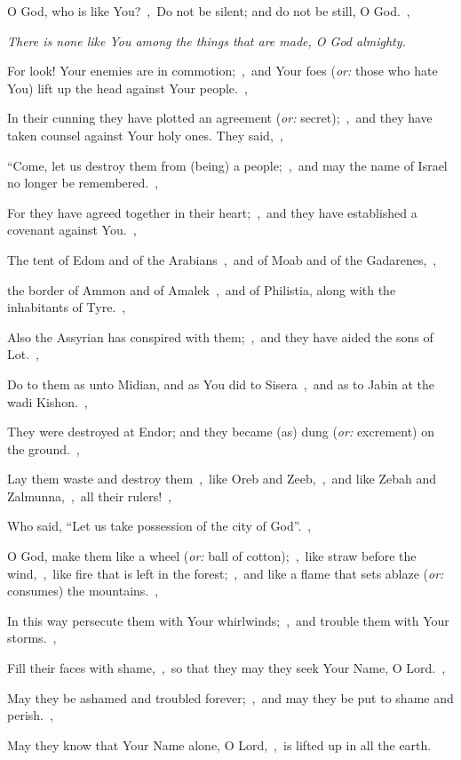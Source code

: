 \documentclass[12pt,twoside,a5paper]{article}
\newcommand{\qanona}[1]{{\liturgicalhint{Qanona.} \emph{#1}}}
\newcommand{\translationoption}[1]{\emph{or:} #1}
\begin{document}
\begin{normalparskip}
  O God, who is like You?~\sep\ Do not be silent; and do not be still, O God.~\sep

  \qanona{There is none like You among the things that are made, O God almighty.}

  For look! Your enemies are in commotion;~\sep\ and Your foes (\translationoption{those who hate You}) lift up the head against Your people.~\sep

  In their cunning they have plotted an agreement (\translationoption{secret});~\sep\ and they have taken counsel against Your holy ones. They said,~\sep

  ``Come, let us destroy them from (being) a people;~\sep\ and may the name of Israel no longer be remembered.~\sep

  For they have agreed together in their heart;~\sep\ and they have established a covenant against You.~\sep

  The tent of Edom and of the Arabians~\sep\ and of Moab and of the Gadarenes,~\sep

  the border of Ammon and of Amalek~\sep\ and of Philistia, along with the inhabitants of Tyre.~\sep

  Also the Assyrian has conspired with them;~\sep\ and they have aided the sons of Lot.~\sep

  Do to them as unto Midian, and as You did to Sisera~\sep\ and as to Jabin at the wadi Kishon.~\sep

  They were destroyed at Endor; and they became (as) dung (\translationoption{excrement}) on the ground.~\sep

  Lay them waste and destroy them~\sep\ like Oreb and Zeeb,~\sep\ and like Zebah and Zalmunna,~\sep\ all their rulers!~\sep

  Who said, ``Let us take possession of the city of God''.~\sep

  O God, make them like a wheel (\translationoption{ball of cotton});~\sep\ like straw before the wind,~\sep\ like fire that is left in the forest;~\sep\ and like a flame that sets ablaze (\translationoption{consumes}) the mountains.~\sep

  In this way persecute them with Your whirlwinds;~\sep\ and trouble them with Your storms.~\sep

  Fill their faces with shame,~\sep\ so that they may they seek Your Name, O Lord.~\sep

  May they be ashamed and troubled forever;~\sep\ and may they be put to shame and perish.~\sep

  May they know that Your Name alone, O Lord,~\sep\ is lifted up in all the earth.
\end{normalparskip}
\end{document}
